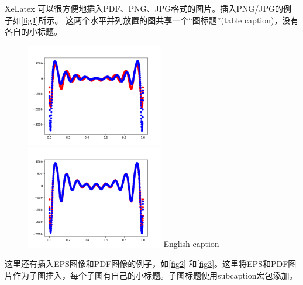 XeLatex 可以很方便地插入PDF、PNG、JPG格式的图片。插入PNG/JPG的例子如\autoref{fig1}所示。
这两个水平并列放置的图共享一个“图标题”(table caption)，没有各自的小标题。

\begin{figure}[htp]
	\centering
	\includegraphics[width=6cm]{figure/example/model1_1000.png}
	\hspace{1cm}
	\includegraphics[width=6cm]{figure/example/model1_10000.png}
	{English caption}
	\label{fig1}
\end{figure}

这里还有插入EPS图像和PDF图像的例子，如\autoref{fig2} 和\autoref{fig3}。这里将EPS和PDF图片作为子图插入，每个子图有自己的小标题。子图标题使用subcaption宏包添加。

